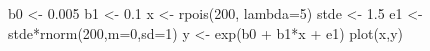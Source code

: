 \begin{Schunk}
\begin{Sinput}
 b0 <- 0.005
 b1 <- 0.1
 x <- rpois(200, lambda=5)
 stde <- 1.5
 e1 <- stde*rnorm(200,m=0,sd=1) 
 y <- exp(b0 + b1*x + e1)
 plot(x,y)
\end{Sinput}
\end{Schunk}
